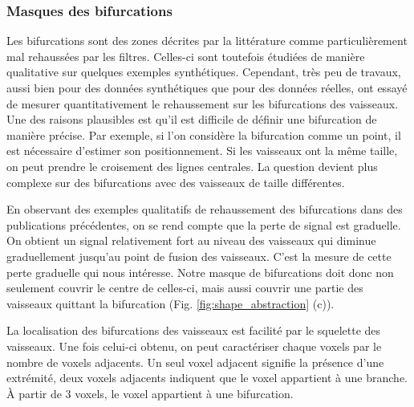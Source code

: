


\subsubsection{Masques des bifurcations}

Les bifurcations sont des zones décrites par la littérature comme particulièrement mal rehaussées par les filtres. Celles-ci sont toutefois étudiées de manière qualitative sur quelques exemples synthétiques. Cependant, très peu de travaux, aussi bien pour des données synthétiques que pour des données réelles, ont essayé de mesurer quantitativement le rehaussement sur les bifurcations des vaisseaux. Une des raisons plausibles est qu'il est difficile de définir une bifurcation de manière précise. Par exemple, si l'on considère la bifurcation comme un point, il est nécessaire d'estimer son positionnement. Si les vaisseaux ont la même taille, on peut prendre le croisement des lignes centrales. La question devient plus complexe sur des bifurcations avec des vaisseaux de taille différentes.

En observant des exemples qualitatifs de rehaussement des bifurcations dans des publications précédentes, on se rend compte que la perte de signal est graduelle. On obtient un signal relativement fort au niveau des vaisseaux qui diminue graduellement jusqu'au point de fusion des vaisseaux. C'est la mesure de cette perte graduelle qui nous intéresse. Notre masque de bifurcations doit donc non seulement couvrir le centre de celles-ci, mais aussi couvrir une partie des vaisseaux quittant la bifurcation (Fig. \ref{fig:shape_abstraction} (c)).

La localisation des bifurcations des vaisseaux est facilité par le squelette des vaisseaux. Une fois celui-ci obtenu, on peut caractériser chaque voxels par le nombre de voxels adjacents. Un seul voxel adjacent signifie la présence d'une extrémité, deux voxels adjacents indiquent que le voxel appartient à une branche. À partir de 3 voxels, le voxel appartient à une bifurcation.

